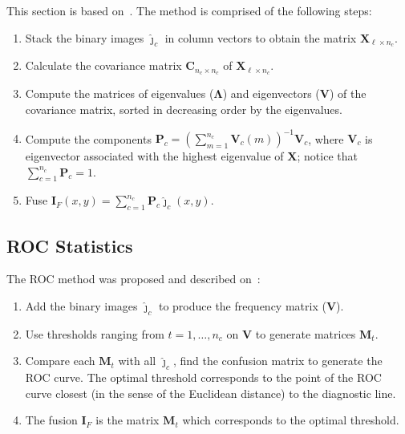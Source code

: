 \documentclass[journal]{IEEEtran}
\begin{document}
This section is based on~\cite{n_r,mit}.
The method is comprised of the following steps:
\begin{enumerate}
\item Stack the binary images $\bm{\widehat\jmath}_c$ in column vectors to obtain the matrix $\bm X_{\ell\times n_c}$.
\item Calculate the covariance matrix $\bm C_{n_c\times n_c}$ of $\bm X_{\ell\times n_c}$.
\item Compute the matrices of eigenvalues ($\bm\Lambda$) and eigenvectors ($\bm V$) of the covariance matrix, sorted in decreasing order by the eigenvalues. %
\item Compute the components $\bm P_c=(\sum_{m=1}^{n_c} \bm V_c(m))^{-1}{\bm V_c}$, where $\bm V_c$ is eigenvector associated with the highest eigenvalue of $\bm X$; notice that $\sum_{c=1}^{n_c}\bm P_c=1$.
\item Fuse $\bm I_F(x,y)=\sum_{c=1}^{n_c}\bm P_c\bm{\widehat\jmath}_c(x,y)$.
\end{enumerate}

\subsection{ROC Statistics}
The ROC method was proposed and described on~\cite{gs,fawcett}:
\begin{enumerate}
\item Add the binary images $\bm{\widehat\jmath}_c$ to produce the frequency matrix ($\bm V$).
\item Use thresholds ranging from $t=1,\dots,n_c$ on $\bm V$ to generate matrices $\bm M_t$.
\item Compare each $\bm M_t$ with all $\bm{\widehat\jmath}_c$, find the confusion matrix to generate the ROC curve. 
The optimal threshold corresponds to the point of the ROC curve closest (in the sense of the Euclidean distance) to the diagnostic line.
\item The fusion $\bm I_F$ is the matrix $\bm M_t$ which corresponds to the optimal threshold.
\end{enumerate}
\end{document}
